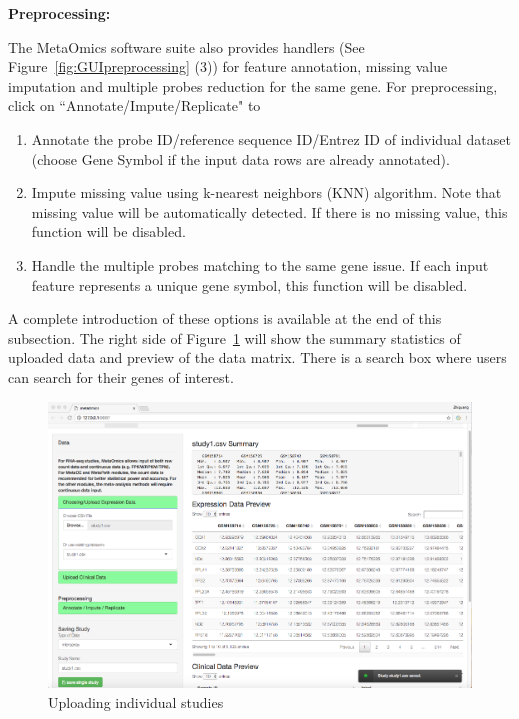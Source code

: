 \begin{steps}
\item \textbf{Preprocessing:}

The MetaOmics software suite also provides handlers (See Figure~\ref{fig:GUIpreprocessing} {\color{red} (3)}) for feature annotation, 
missing value imputation and multiple probes reduction for the same gene.
For preprocessing, 
click on ``Annotate/Impute/Replicate" to 
\begin{enumerate}
\item Annotate the probe ID/reference sequence ID/Entrez ID of individual dataset (choose Gene Symbol if the input data rows are already annotated).
\item Impute missing value using k-nearest neighbors (KNN) algorithm.
Note that missing value will be automatically detected. 
If there is no missing value, this function will be disabled.

\item Handle the multiple probes matching to the same gene issue.
If each input feature represents a unique gene symbol, this function will be disabled.

\end{enumerate}

A complete introduction of these options is available at the end of this subsection.
The right side of Figure~\ref{fig:GUIpreview} will show the summary statistics of uploaded data and preview of the data matrix.
There is a search box where users can search for their genes of interest.

\begin{figure}[H]
\begin{center}
\includegraphics[scale=1]{./figure/preprocessing/GUIpreview}
\caption{Uploading individual studies}
\label{fig:GUIpreview}
\end{center}
\end{figure}


\end{steps}
